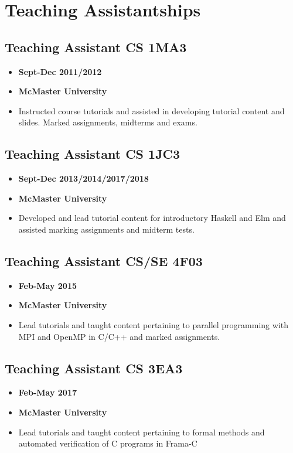 \documentclass[12pt]{report}
\begin{document}
\section{Teaching Assistantships}
\label{sec:org4fe2b1a}
\subsection{Teaching Assistant CS 1MA3}
\label{sec:orge7eee52}
\begin{itemize}
\item \textbf{Sept-Dec 2011/2012}
\item \textbf{McMaster University}
\item Instructed course tutorials and assisted in developing tutorial content and
slides. Marked assignments, midterms and exams.
\end{itemize}

\subsection{Teaching Assistant CS 1JC3}
\label{sec:org65e588b}
\begin{itemize}
\item \textbf{Sept-Dec 2013/2014/2017/2018}
\item \textbf{McMaster University}
\item Developed and lead tutorial content for
introductory Haskell and Elm and
assisted marking assignments and midterm tests.
\end{itemize}

\subsection{Teaching Assistant CS/SE 4F03}
\label{sec:orgd4df4ac}
\begin{itemize}
\item \textbf{Feb-May 2015}
\item \textbf{McMaster University}
\item Lead tutorials and taught content
pertaining to parallel programming with MPI and OpenMP in C/C++ and
marked assignments.
\end{itemize}

\subsection{Teaching Assistant CS 3EA3}
\label{sec:org29d9c4a}
\begin{itemize}
\item \textbf{Feb-May 2017}
\item \textbf{McMaster University}
\item Lead tutorials and taught content pertaining to formal methods and automated
verification of C programs in Frama-C
\end{itemize}
\end{document}
